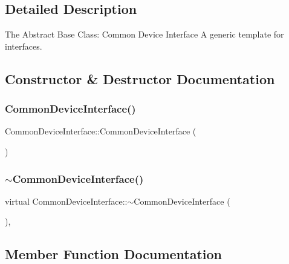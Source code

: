 \subsection{Detailed Description}
The Abstract Base Class\+: Common Device Interface A generic template for interfaces. 

\subsection{Constructor \& Destructor Documentation}
\hypertarget{class_common_device_interface_ac9a72399dfc2b67e515719509ae7cf89}{}\label{class_common_device_interface_ac9a72399dfc2b67e515719509ae7cf89} 
\subsubsection{\texorpdfstring{Common\+Device\+Interface()}{CommonDeviceInterface()}}
{\footnotesize\ttfamily Common\+Device\+Interface\+::\+Common\+Device\+Interface (\begin{DoxyParamCaption}{ }\end{DoxyParamCaption})\hspace{0.3cm}{\ttfamily [inline]}}

\hypertarget{class_common_device_interface_aeb4b4a026ad42082cff5b7dbe41e29c8}{}\label{class_common_device_interface_aeb4b4a026ad42082cff5b7dbe41e29c8} 
\subsubsection{\texorpdfstring{$\sim$\+Common\+Device\+Interface()}{~CommonDeviceInterface()}}
{\footnotesize\ttfamily virtual Common\+Device\+Interface\+::$\sim$\+Common\+Device\+Interface (\begin{DoxyParamCaption}{ }\end{DoxyParamCaption})\hspace{0.3cm}{\ttfamily [inline]}, {\ttfamily [virtual]}}



\subsection{Member Function Documentation}
\hypertarget{class_common_device_interface_ad670a54efd57ef65a659623f2a0b76e9}{}\label{class_common_device_interface_ad670a54efd57ef65a659623f2a0b76e9} 
